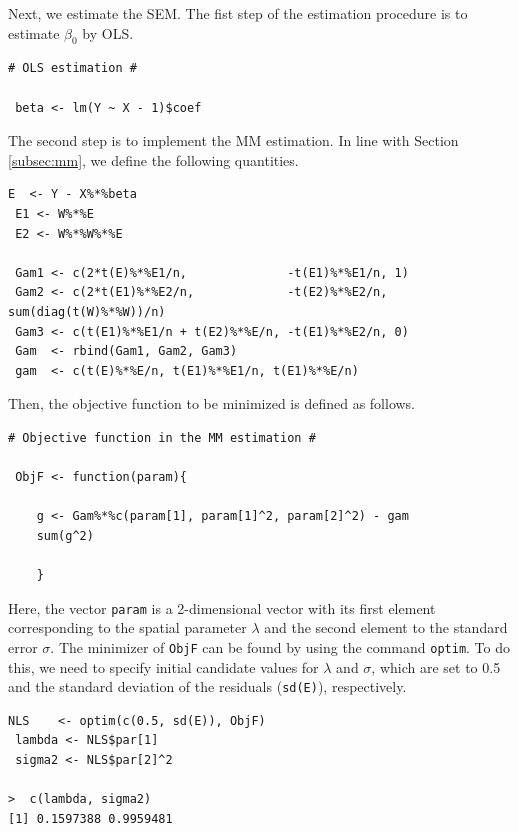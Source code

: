 \documentclass[10.5pt, A4paper, openany, uplatex]{book}
\numberwithin{equation}{section}
\begin{document}
Next, we estimate the SEM.
The fist step of the estimation procedure is to estimate $\beta_0$ by OLS. 
\begin{lstlisting}[basicstyle=\ttfamily\footnotesize, frame=single]
# OLS estimation #

 beta <- lm(Y ~ X - 1)$coef
\end{lstlisting}
The second step is to implement the MM estimation.
In line with Section \ref{subsec:mm}, we define the following quantities.
\begin{lstlisting}[basicstyle=\ttfamily\footnotesize, frame=single]
 E  <- Y - X%*%beta
 E1 <- W%*%E
 E2 <- W%*%W%*%E

 Gam1 <- c(2*t(E)%*%E1/n,              -t(E1)%*%E1/n, 1)
 Gam2 <- c(2*t(E1)%*%E2/n,             -t(E2)%*%E2/n, sum(diag(t(W)%*%W))/n) 
 Gam3 <- c(t(E1)%*%E1/n + t(E2)%*%E/n, -t(E1)%*%E2/n, 0)
 Gam  <- rbind(Gam1, Gam2, Gam3)
 gam  <- c(t(E)%*%E/n, t(E1)%*%E1/n, t(E1)%*%E/n)
\end{lstlisting}
Then, the objective function to be minimized is defined as follows.
\begin{lstlisting}[basicstyle=\ttfamily\footnotesize, frame=single]
# Objective function in the MM estimation #

 ObjF <- function(param){

	g <- Gam%*%c(param[1], param[1]^2, param[2]^2) - gam
	sum(g^2)

	}
\end{lstlisting}
Here, the vector \texttt{param} is a 2-dimensional vector with its first element corresponding to the spatial parameter $\lambda$ and the second element to the standard error $\sigma$.
The minimizer of \texttt{ObjF} can be found by using the command \texttt{optim}.
To do this, we need to specify initial candidate values for $\lambda$ and $\sigma$, which are set to 0.5 and the standard deviation of the residuals (\texttt{sd(E)}), respectively.
\begin{lstlisting}[basicstyle=\ttfamily\footnotesize, frame=single]
 NLS    <- optim(c(0.5, sd(E)), ObjF)
 lambda <- NLS$par[1]
 sigma2 <- NLS$par[2]^2

>  c(lambda, sigma2)
[1] 0.1597388 0.9959481
\end{lstlisting}
\end{document}
